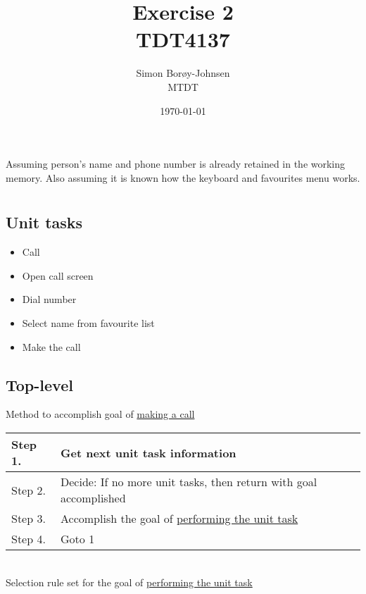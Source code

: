 \documentclass{article}
\begin{document}
\title{\textbf{Exercise 2} \\ TDT4137}
\author{Simon Borøy-Johnsen \\ MTDT}
\date{\today}
\maketitle

Assuming person's name and phone number is already retained in the working memory. Also assuming it is known how the keyboard and favourites menu works.

\section{}

\subsection*{Unit tasks}
\begin{itemize}
	\item Call
	\item Open call screen
	\item Dial number
	\item Select name from favourite list
	\item Make the call
\end{itemize}

\subsection*{Top-level}
Method to accomplish goal of \uline{making a call}

\begin{tabulary}{\textwidth}{| L | L |}
	\hline
	Step 1. & Get next unit task information \\\hline
	Step 2. & Decide: If no more unit tasks, then return with goal accomplished \\\hline
	Step 3. & Accomplish the goal of 
\uline{performing the unit task} \\\hline
	Step 4. & Goto 1 \\\hline
\end{tabulary}\\

Selection rule set for the goal of \uline{performing the unit task}
\end{document}
